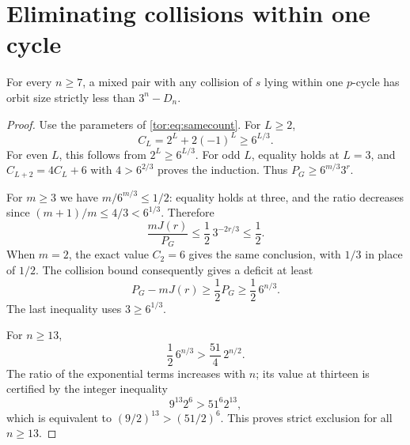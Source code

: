 \documentclass[11pt,a4paper]{article}
\numberwithin{equation}{section}
\theoremstyle{definition}
\theoremstyle{remark}
\begin{document}
\section{Eliminating collisions within one cycle}\label{tor:sec:same}

\begin{lemma}\label{tor:lem:sameexclude}
For every $n\ge7$, a mixed pair with any collision of $s$ lying within one
$p$-cycle has orbit size strictly less than $3^n-D_n$.
\end{lemma}
\begin{proof}
Use the parameters of \eqref{tor:eq:samecount}. For $L\ge2$,
\begin{equation}\label{tor:eq:Clower}
 C_L=2^L+2(-1)^L\ge6^{L/3}.
\end{equation}
For even $L$, this follows from $2^L\ge6^{L/3}$. For odd $L$, equality holds
at $L=3$, and $C_{L+2}=4C_L+6$ with $4>6^{2/3}$ proves the induction. Thus
$P_G\ge6^{m/3}3^r$.

For $m\ge3$ we have $m/6^{m/3}\le1/2$: equality holds at three, and the ratio
decreases since $(m+1)/m\le4/3<6^{1/3}$. Therefore
\[
 \frac{mJ(r)}{P_G}\le\frac12\,3^{-2r/3}\le\frac12.
\]
When $m=2$, the exact value $C_2=6$ gives the same conclusion, with $1/3$ in
place of $1/2$. The collision bound consequently gives a deficit at least
\begin{equation}\label{tor:eq:samedeficit}
 P_G-mJ(r)\ge\frac12P_G\ge\frac12\,6^{n/3}.
\end{equation}
The last inequality uses $3\ge6^{1/3}$.

For $n\ge13$,
\[
 \frac12\,6^{n/3}>\frac{51}{4}\,2^{n/2}.
\]
The ratio of the exponential terms increases with $n$; its value at thirteen
is certified by the integer inequality
\begin{equation}\label{tor:eq:threshold}
 9^{13}2^6>51^6 2^{13},
\end{equation}
which is equivalent to $(9/2)^{13}>(51/2)^6$. This proves strict exclusion
for all $n\ge13$.


\end{proof}
\end{document}
